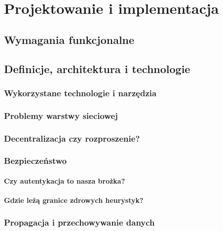 \chapter{Projektowanie i implementacja}
\label{cha:implementacja}



\section{Wymagania funkcjonalne}
\label{sec:funkcjonalnosc}

\section{Definicje, architektura i technologie}
\label{sec:zalozeniaProjektu}

\subsection{Wykorzystane technologie i narzędzia}
\label{sec:techNTools}

\subsection{Problemy warstwy sieciowej}
\label{sec:networkIssues}

\subsection{Decentralizacja czy rozproszenie?}
\label{sec:decentralizacjaCzyRozproszenie}

\subsection{Bezpieczeństwo}
\label{sec:security}

\subsubsection{Czy autentykacja to nasza brożka?}
\subsubsection{Gdzie leżą granice zdrowych heurystyk?}

\subsection{Propagacja i przechowywanie danych}
\label{sec:dataPropagation}

